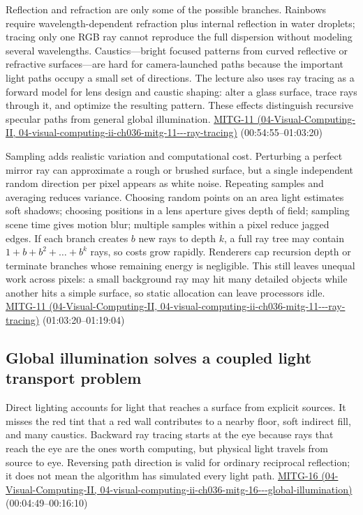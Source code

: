 Reflection and refraction are only some of the possible branches. Rainbows require wavelength-dependent refraction plus internal reflection in water droplets; tracing only one RGB ray cannot reproduce the full dispersion without modeling several wavelengths. Caustics---bright focused patterns from curved reflective or refractive surfaces---are hard for camera-launched paths because the important light paths occupy a small set of directions. The lecture also uses ray tracing as a forward model for lens design and caustic shaping: alter a glass surface, trace rays through it, and optimize the resulting pattern. These effects distinguish recursive specular paths from general global illumination. \href{../04-Visual-Computing-II/main.pdf\#nameddest=04-visual-computing-ii-ch036-mitg-11---ray-tracing}{MITG-11 (04-Visual-Computing-II, 04-visual-computing-ii-ch036-mitg-11-\/-\/-ray-tracing)} (00:54:55--01:03:20)

Sampling adds realistic variation and computational cost. Perturbing a perfect mirror ray can approximate a rough or brushed surface, but a single independent random direction per pixel appears as white noise. Repeating samples and averaging reduces variance. Choosing random points on an area light estimates soft shadows; choosing positions in a lens aperture gives depth of field; sampling scene time gives motion blur; multiple samples within a pixel reduce jagged edges. If each branch creates \(b\) new rays to depth \(k\), a full ray tree may contain \(1+b+b^2+\dots+b^k\) rays, so costs grow rapidly. Renderers cap recursion depth or terminate branches whose remaining energy is negligible. This still leaves unequal work across pixels: a small background ray may hit many detailed objects while another hits a simple surface, so static allocation can leave processors idle. \href{../04-Visual-Computing-II/main.pdf\#nameddest=04-visual-computing-ii-ch036-mitg-11---ray-tracing}{MITG-11 (04-Visual-Computing-II, 04-visual-computing-ii-ch036-mitg-11-\/-\/-ray-tracing)} (01:03:20--01:19:04)

\subsection{Global illumination solves a coupled light transport problem}\label{03-visual-computing-i-ch011-global-illumination-solves-a-coupled-light-transport-problem}

Direct lighting accounts for light that reaches a surface from explicit sources. It misses the red tint that a red wall contributes to a nearby floor, soft indirect fill, and many caustics. Backward ray tracing starts at the eye because rays that reach the eye are the ones worth computing, but physical light travels from source to eye. Reversing path direction is valid for ordinary reciprocal reflection; it does not mean the algorithm has simulated every light path. \href{../04-Visual-Computing-II/main.pdf\#nameddest=04-visual-computing-ii-ch036-mitg-16---global-illumination}{MITG-16 (04-Visual-Computing-II, 04-visual-computing-ii-ch036-mitg-16-\/-\/-global-illumination)} (00:04:49--00:16:10)

